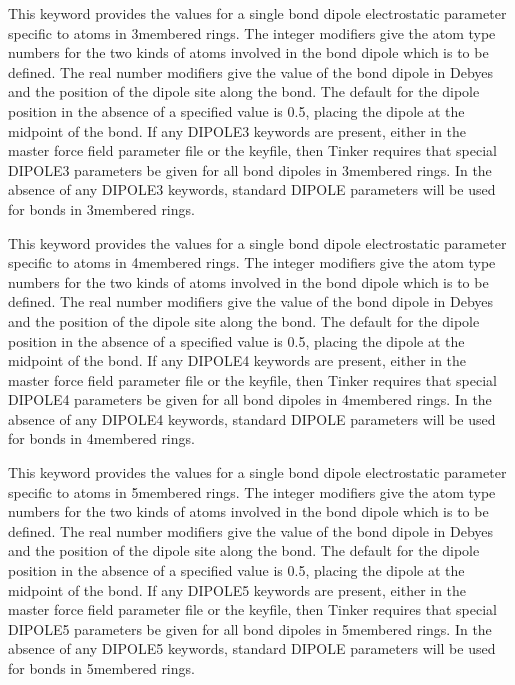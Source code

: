 \documentclass[letterpaper,11pt,english]{sphinxmanual}
\begin{document}
  This keyword provides the values for a single bond dipole electrostatic parameter specific to atoms in 3\sphinxhyphen{}membered rings. The integer modifiers give the atom type numbers for the two kinds of atoms involved in the bond dipole which is to be defined. The real number modifiers give the value of the bond dipole in Debyes and the position of the dipole site along the bond. The default for the dipole position in the absence of a specified value is 0.5, placing the dipole at the midpoint of the bond. If any DIPOLE3 keywords are present, either in the master force field parameter file or the keyfile, then Tinker requires that special DIPOLE3 parameters be given for all bond dipoles in 3\sphinxhyphen{}membered rings. In the absence of any DIPOLE3 keywords, standard DIPOLE parameters will be used for bonds in 3\sphinxhyphen{}membered rings.

  This keyword provides the values for a single bond dipole electrostatic parameter specific to atoms in 4\sphinxhyphen{}membered rings. The integer modifiers give the atom type numbers for the two kinds of atoms involved in the bond dipole which is to be defined. The real number modifiers give the value of the bond dipole in Debyes and the position of the dipole site along the bond. The default for the dipole position in the absence of a specified value is 0.5, placing the dipole at the midpoint of the bond. If any DIPOLE4 keywords are present, either in the master force field parameter file or the keyfile, then Tinker requires that special DIPOLE4 parameters be given for all bond dipoles in 4\sphinxhyphen{}membered rings. In the absence of any DIPOLE4 keywords, standard DIPOLE parameters will be used for bonds in 4\sphinxhyphen{}membered rings.

  This keyword provides the values for a single bond dipole electrostatic parameter specific to atoms in 5\sphinxhyphen{}membered rings. The integer modifiers give the atom type numbers for the two kinds of atoms involved in the bond dipole which is to be defined. The real number modifiers give the value of the bond dipole in Debyes and the position of the dipole site along the bond. The default for the dipole position in the absence of a specified value is 0.5, placing the dipole at the midpoint of the bond. If any DIPOLE5 keywords are present, either in the master force field parameter file or the keyfile, then Tinker requires that special DIPOLE5 parameters be given for all bond dipoles in 5\sphinxhyphen{}membered rings. In the absence of any DIPOLE5 keywords, standard DIPOLE parameters will be used for bonds in 5\sphinxhyphen{}membered rings.
\end{document}
